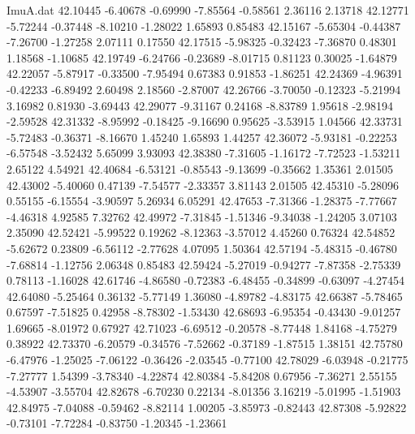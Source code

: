 \begin{filecontents}{ImuA.dat}
  42.10445   -6.40678   -0.69990   -7.85564   -0.58561    2.36116    2.13718
  42.12771   -5.72244   -0.37448   -8.10210   -1.28022    1.65893    0.85483
  42.15167   -5.65304   -0.44387   -7.26700   -1.27258    2.07111    0.17550
  42.17515   -5.98325   -0.32423   -7.36870    0.48301    1.18568   -1.10685
  42.19749   -6.24766   -0.23689   -8.01715    0.81123    0.30025   -1.64879
  42.22057   -5.87917   -0.33500   -7.95494    0.67383    0.91853   -1.86251
  42.24369   -4.96391   -0.42233   -6.89492    2.60498    2.18560   -2.87007
  42.26766   -3.70050   -0.12323   -5.21994    3.16982    0.81930   -3.69443
  42.29077   -9.31167    0.24168   -8.83789    1.95618   -2.98194   -2.59528
  42.31332   -8.95992   -0.18425   -9.16690    0.95625   -3.53915    1.04566
  42.33731   -5.72483   -0.36371   -8.16670    1.45240    1.65893    1.44257
  42.36072   -5.93181   -0.22253   -6.57548   -3.52432    5.65099    3.93093
  42.38380   -7.31605   -1.16172   -7.72523   -1.53211    2.65122    4.54921
  42.40684   -6.53121   -0.85543   -9.13699   -0.35662    1.35361    2.01505
  42.43002   -5.40060    0.47139   -7.54577   -2.33357    3.81143    2.01505
  42.45310   -5.28096    0.55155   -6.15554   -3.90597    5.26934    6.05291
  42.47653   -7.31366   -1.28375   -7.77667   -4.46318    4.92585    7.32762
  42.49972   -7.31845   -1.51346   -9.34038   -1.24205    3.07103    2.35090
  42.52421   -5.99522    0.19262   -8.12363   -3.57012    4.45260    0.76324
  42.54852   -5.62672    0.23809   -6.56112   -2.77628    4.07095    1.50364
  42.57194   -5.48315   -0.46780   -7.68814   -1.12756    2.06348    0.85483
  42.59424   -5.27019   -0.94277   -7.87358   -2.75339    0.78113   -1.16028
  42.61746   -4.86580   -0.72383   -6.48455   -0.34899   -0.63097   -4.27454
  42.64080   -5.25464    0.36132   -5.77149    1.36080   -4.89782   -4.83175
  42.66387   -5.78465    0.67597   -7.51825    0.42958   -8.78302   -1.53430
  42.68693   -6.95354   -0.43430   -9.01257    1.69665   -8.01972    0.67927
  42.71023   -6.69512   -0.20578   -8.77448    1.84168   -4.75279    0.38922
  42.73370   -6.20579   -0.34576   -7.52662   -0.37189   -1.87515    1.38151
  42.75780   -6.47976   -1.25025   -7.06122   -0.36426   -2.03545   -0.77100
  42.78029   -6.03948   -0.21775   -7.27777    1.54399   -3.78340   -4.22874
  42.80384   -5.84208    0.67956   -7.36271    2.55155   -4.53907   -3.55704
  42.82678   -6.70230    0.22134   -8.01356    3.16219   -5.01995   -1.51903
  42.84975   -7.04088   -0.59462   -8.82114    1.00205   -3.85973   -0.82443
  42.87308   -5.92822   -0.73101   -7.72284   -0.83750   -1.20345   -1.23661

\end{filecontents}
